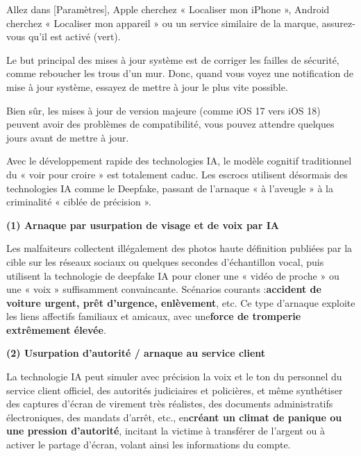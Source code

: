 Allez dans [Paramètres], Apple cherchez « Localiser mon iPhone », Android cherchez « Localiser mon appareil » ou un service similaire de la marque, assurez-vous qu'il est activé (vert).


Le but principal des mises à jour système est de corriger les failles de sécurité, comme reboucher les trous d'un mur. Donc, quand vous voyez une notification de mise à jour système, essayez de mettre à jour le plus vite possible.

Bien sûr, les mises à jour de version majeure (comme iOS 17 vers iOS 18) peuvent avoir des problèmes de compatibilité, vous pouvez attendre quelques jours avant de mettre à jour.


Avec le développement rapide des technologies IA, le modèle cognitif traditionnel du « voir pour croire » est totalement caduc. Les escrocs utilisent désormais des technologies IA comme le Deepfake, passant de l'arnaque « à l'aveugle » à la criminalité « ciblée de précision ».


\textbf{(1) Arnaque par usurpation de visage et de voix par IA}\par

Les malfaiteurs collectent illégalement des photos haute définition publiées par la cible sur les réseaux sociaux ou quelques secondes d'échantillon vocal, puis utilisent la technologie de deepfake IA pour cloner une « vidéo de proche » ou une « voix » suffisamment convaincante. Scénarios courants :\textbf{accident de voiture urgent, prêt d'urgence, enlèvement}, etc. Ce type d'arnaque exploite les liens affectifs familiaux et amicaux, avec une\textbf{force de tromperie extrêmement élevée}.

\textbf{(2) Usurpation d'autorité / arnaque au service client}\par

La technologie IA peut simuler avec précision la voix et le ton du personnel du service client officiel, des autorités judiciaires et policières, et même synthétiser des captures d'écran de virement très réalistes, des documents administratifs électroniques, des mandats d'arrêt, etc., en\textbf{créant un climat de panique ou une pression d'autorité}, incitant la victime à transférer de l'argent ou à activer le partage d'écran, volant ainsi les informations du compte.

